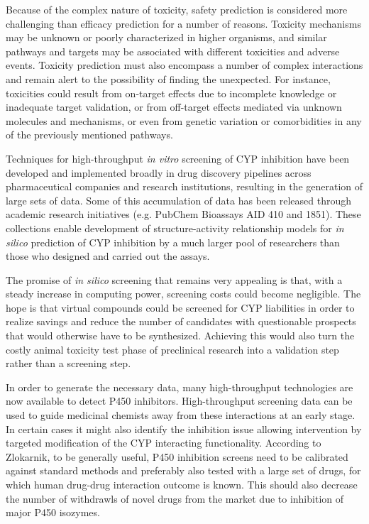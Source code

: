 Because of the complex nature of toxicity, safety prediction is considered more challenging than efficacy prediction for a number of reasons. Toxicity mechanisms may be unknown or poorly characterized in higher organisms, and similar pathways and targets may be associated with different toxicities and adverse events. Toxicity prediction must also encompass a number of complex interactions and remain alert to the possibility of finding the unexpected. For instance, toxicities could result from on-target effects due to incomplete knowledge or inadequate target validation, or from off-target effects mediated via unknown molecules and mechanisms, or even from genetic variation or comorbidities in any of the previously mentioned pathways. \cite{Kruhlak2012}

Techniques for high-throughput \textit{in vitro} screening of CYP inhibition have been developed and implemented broadly in drug discovery pipelines across pharmaceutical companies and research institutions, resulting in the generation of large sets of data. Some of this accumulation of data has been released through academic research initiatives (e.g. PubChem Bioassays AID 410 and 1851). These collections enable development of structure-activity relationship models for \textit{in silico} prediction of CYP inhibition by a much larger pool of researchers than those who designed and carried out the assays.

The promise of \textit{in silico} screening that remains very appealing is that, with a steady increase in computing power, screening costs could become negligible. The hope is that virtual compounds could be screened for CYP liabilities in order to realize savings and reduce the number of candidates with questionable prospects that would otherwise have to be synthesized. \cite{Zlokarnik2005} Achieving this would also turn the costly animal toxicity test phase of preclinical research into a validation step rather than a screening step.

In order to generate the necessary data, many high-throughput technologies are now available to detect P450 inhibitors. High-throughput screening data can be used to guide medicinal chemists away from these interactions at an early stage. In certain cases it might also identify the inhibition issue allowing intervention by targeted modification of the CYP interacting functionality. According to Zlokarnik, to be generally useful, P450 inhibition screens need to be calibrated against standard methods and preferably also tested with a large set of drugs, for which human drug-drug interaction outcome is known. \cite{Zlokarnik2005} This should also decrease the number of withdrawls of novel drugs from the market due to inhibition of major P450 isozymes.

